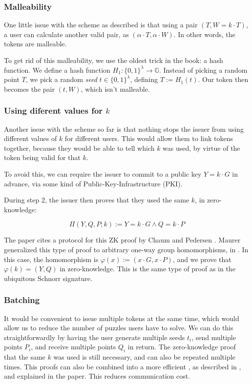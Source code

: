 \documentclass[9pt, a4paper]{article}
\begin{document}
\subsubsection{Malleability}

One little issue with the scheme as described is that using
a pair $(T, W = k \cdot T)$, a user can calculate another valid pair,
as $(\alpha \cdot T, \alpha \cdot W)$. In other words, the tokens
are malleable.

To get rid of this malleability, we use the oldest trick in the book:
a hash function. We define a hash function $H_1 : \{0, 1\}^\lambda \to \mathbb{G}$.
Instead of picking a random point $T$, we pick a random \textit{seed}
$t \in \{0, 1\}^\lambda$, defining $T := H_1(t)$. Our token then
becomes the pair $(t, W)$, which isn't malleable.

\subsubsection{Using diferent values for $k$}

Another issue with the scheme so far is that nothing stops the issuer
from using different values of $k$ for different users. This would
allow them to link tokens together, because they would be able to tell
which $k$ was used, by virtue of the token being valid for that $k$.

To avoid this, we can require the issuer to commit to a public key
$Y = k \cdot G$ in advance, via some kind of Public-Key-Infrastructure (PKI).

During step 2, the issuer then proves that they used the same $k$, in zero-knowledge:

$$
\Pi(Y, Q, P ; k) := Y = k \cdot G \land Q = k \cdot P
$$

The paper cites a protocol for this ZK proof by Chaum and Pedersen
\cite{chaum_wallet_92}. Maurer generalized this type of proof
to arbitrary one-way group homomorphisms, in \cite{maurer_2009}.
In this case, the homomorphism is $\varphi(x) := (x \cdot G, x \cdot P)$,
and we prove that $\varphi(k) = (Y, Q)$ in zero-knowledge. This is
the same type of proof as in the ubiquitous Schnorr signature.

\subsubsection{Batching}

It would be convenient to issue multiple tokens at the same time,
which would allow us to reduce the number of puzzles users have to solve.
We can do this straightforwardly by having the user generate
multiple seeds $t_i$, send multiple points $P_i$, and receive multiple points
$Q_i$ in return. The zero-knowledge proof that the same $k$ was used
is still necessary, and can also be repeated multiple times. This
proofs can also be combined into a more efficient ,
as described in \cite{henry_13}, and explained in the paper. This reduces
communication cost.
\end{document}
